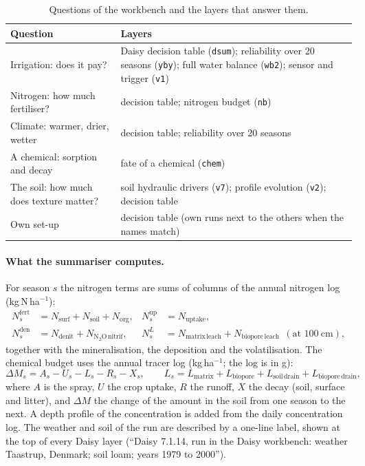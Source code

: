\documentclass[preprint,12pt]{elsarticle}
\begin{document}
\begin{table}[H]\centering\small
\caption{Questions of the workbench and the layers that answer them.}\label{tab:match}
\begin{tabularx}{\textwidth}{>{\raggedright\arraybackslash}p{3.2cm}X}
\toprule Question & Layers\\\midrule
Irrigation: does it pay? & Daisy decision table (\texttt{dsum}); reliability over 20 seasons (\texttt{yby}); full water balance (\texttt{wb2}); sensor and trigger (\texttt{v1})\\
Nitrogen: how much fertiliser? & decision table; nitrogen budget (\texttt{nb})\\
Climate: warmer, drier, wetter & decision table; reliability over 20 seasons\\
A chemical: sorption and decay & fate of a chemical (\texttt{chem})\\
The soil: how much does texture matter? & soil hydraulic drivers (\texttt{v7}); profile evolution (\texttt{v2}); decision table\\
Own set-up & decision table (own runs next to the others when the names match)\\\bottomrule
\end{tabularx}
\end{table}

\paragraph{What the summariser computes.}
For season $s$ the nitrogen terms are sums of columns of the annual nitrogen log (kg\,N\,ha$^{-1}$):
\begin{equation}\label{eq:nsum}
\begin{aligned}
N^{\mathrm{fert}}_s&=N_{\mathrm{surf}}+N_{\mathrm{soil}}+N_{\mathrm{org}}, & N^{\mathrm{up}}_s&=N_{\mathrm{uptake}},\\
N^{\mathrm{den}}_s&=N_{\mathrm{denit}}+N_{\mathrm{N_2O\,nitrif}}, & N^{L}_s&=N_{\mathrm{matrix\,leach}}+N_{\mathrm{biopore\,leach}}\ \ (\text{at }100\ \mathrm{cm}),
\end{aligned}
\end{equation}
together with the mineralisation, the deposition and the volatilisation. The chemical budget uses the annual tracer log (kg\,ha$^{-1}$; the log is in g):
\begin{equation}\label{eq:chem}
\Delta M_s = A_s - U_s - L_s - R_s - X_s,\qquad L_s=L_{\mathrm{matrix}}+L_{\mathrm{biopore}}+L_{\mathrm{soil\,drain}}+L_{\mathrm{biopore\,drain}},
\end{equation}
where $A$ is the spray, $U$ the crop uptake, $R$ the runoff, $X$ the decay (soil, surface and litter), and $\Delta M$ the change of the amount in the soil from one season to the next. A depth profile of the concentration is added from the daily concentration log. The weather and soil of the run are described by a one-line label, shown at the top of every Daisy layer (``Daisy 7.1.14, run in the Daisy workbench: weather Taastrup, Denmark; soil loam; years 1979 to 2000'').
\end{document}
